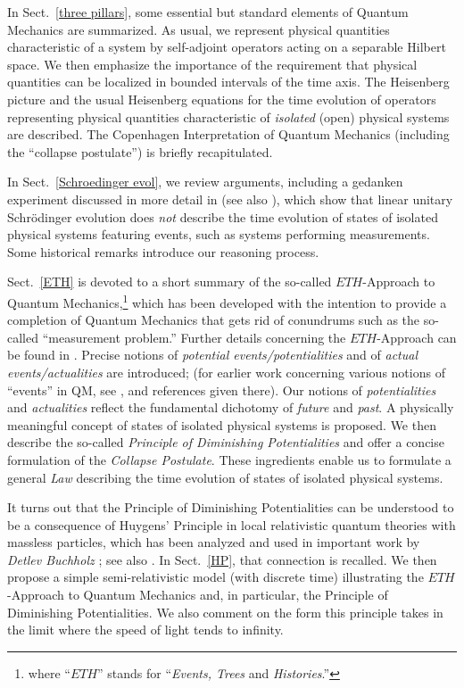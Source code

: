 \documentclass[a4paper,11pt]{article}
\begin{document}
In Sect.~\ref{three pillars}, some essential but standard elements of Quantum Mechanics are summarized. 
As usual, we represent physical quantities characteristic of a system by self-adjoint operators acting on a separable Hilbert 
space. We then emphasize the importance of the requirement that physical quantities can be localized in bounded intervals 
of the time axis. The Heisenberg picture and the usual Heisenberg equations for the time evolution of operators representing 
physical quantities characteristic of \textit{isolated} (open) physical systems are described. The Copenhagen Interpretation 
of Quantum Mechanics (including the ``collapse postulate'') is briefly recapitulated.

In Sect.~\ref{Schroedinger evol}, we review arguments, including a gedanken experiment discussed in more detail in 
\cite{FFS} (see also \cite{Schill}), which show that linear unitary Schr\"odinger evolution does \textit{not} describe the 
time evolution of states of isolated physical systems featuring events, such as systems performing measurements. Some historical remarks introduce our reasoning process.

Sect.~\ref{ETH} is devoted to a short summary of the so-called $ETH$-Approach to Quantum Mechanics,\footnote{where 
``$ETH$'' stands for ``\textit{Events, Trees} and \textit{Histories}.''}  which has 
been developed with the intention to provide a completion of Quantum Mechanics that gets rid of conundrums such 
as the so-called ``measurement problem.'' Further details concerning the $ETH$-Approach can be found in 
\cite{F-Schub, BFS, Fr1, LMU-19, Fr2}. Precise notions of \textit{potential events/potentialities} and of 
\textit{actual events/actualities} are introduced; (for earlier work concerning various notions of ``events'' in QM, see 
\cite{Rudolf, Blanchard}, and references given there). Our notions of \textit{potentialities} and \textit{actualities} reflect the 
fundamental dichotomy of \textit{future} and \textit{past}. A physically meaningful concept of states of isolated physical 
systems is proposed. We then describe the so-called \textit{Principle of Diminishing Potentialities} and offer a concise 
formulation of the \textit{Collapse Postulate}. These ingredients enable us to formulate a general \textit{Law} describing 
the time evolution of states of isolated physical systems.

It turns out that the Principle of Diminishing Potentialities can be understood to be a consequence of Huygens' Principle in 
local relativistic quantum theories with massless particles, which has been analyzed and used in important work by 
\textit{Detlev Buchholz} \cite{Buchholz}; see also \cite{BRob}. In Sect.~\ref{HP}, that connection is recalled. We then propose 
a simple semi-relativistic model (with discrete time) illustrating the $ETH$-Approach to Quantum Mechanics and, 
in particular, the Principle of Diminishing Potentialities. We also comment on the form this principle takes in the limit 
where the speed of light tends to infinity.
\end{document}
